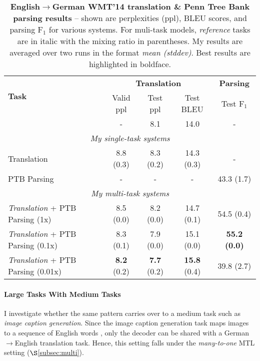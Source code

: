 \begin{table}[tbh!]
\centering
\begin{tabular}{l|c|c|c|c}
\multirow{ 2}{*}{\bf{Task}} & \multicolumn{3}{c|}{{\bf Translation}} &
\multicolumn{1}{c}{{\bf
Parsing}}\\
  \cline{2-5}
  & Valid ppl & Test ppl & Test BLEU & Test F$_1$ \\
  \hline
\citep{luong15attn} & - & 8.1 & 14.0 & -  \\
  \hline
\multicolumn{5}{c}{{\it My single-task systems}} \\
  \hline
Translation & 8.8 (0.3) & 8.3 (0.2) & 14.3 (0.3) & -\\
  \hline
PTB Parsing & - & - & - & 43.3 (1.7) \\
  \hline
\multicolumn{5}{c}{{\it My multi-task systems}} \\
  \hline
{\it Translation} + PTB Parsing (1x) &  8.5 (0.0) & 8.2 (0.0) & 14.7 (0.1) & 54.5 (0.4) \\
  \hline
{\it Translation} + PTB Parsing (0.1x) &  8.3 (0.1) & 7.9 (0.0) & 15.1 (0.0) &
{\bf 55.2 (0.0)}\\
  \hline
{\it Translation} + PTB Parsing (0.01x) &  {\bf 8.2} (0.2) & {\bf 7.7} (0.2) & {\bf
15.8} (0.4) & 39.8 (2.7) \\
\end{tabular}
\caption[Translation \& Penn Tree Bank parsing
results]{{\bf English$\rightarrow$German WMT'14 translation \& Penn Tree Bank parsing results} --
shown are perplexities (ppl), BLEU scores, and parsing F$_1$ for various systems. For muli-task
models, {\it reference} tasks are in
italic with the mixing ratio in parentheses. My results are averaged over two
runs
in the format {\it mean (stddev)}. Best results are
highlighted in boldface.}
\label{t:big_small}
\end{table}

\paragraph{Large Tasks With Medium Tasks} %
I investigate whether the same pattern carries over to a medium task
such as {\it image caption generation}. Since the image caption
generation task maps images to a sequence of
English words \citep{vinyals15caption,xu15}, only the decoder can be
shared with a German$\rightarrow$English translation task. Hence, this
setting falls under the {\it many-to-one} MTL setting ($\S$\ref{subsec:multi}).

